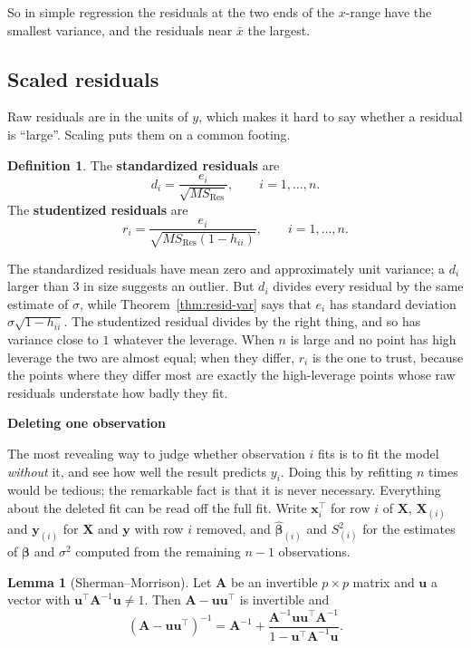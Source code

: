 \documentclass[11pt,a4paper]{article}
\numberwithin{equation}{section}
\theoremstyle{definition}
\newtheorem{defn}[thm]{Definition}
\newtheorem{lem}[thm]{Lemma}
\newcommand{\subhead}[1]{%
  \par\medskip\noindent\textbf{#1}\par\nobreak\smallskip}
\begin{document}
So in simple regression the residuals at the two ends of the $x$-range have the smallest
variance, and the residuals near $\bar x$ the largest.

\subsection{Scaled residuals}
Raw residuals are in the units of $y$, which makes it hard to say whether a residual is
``large''. Scaling puts them on a common footing.

\begin{defn}
The \textbf{standardized residuals} are
\[
d_i = \frac{e_i}{\sqrt{MS_{\mathrm{Res}}}} , \qquad i = 1, \dots, n .
\]
The \textbf{studentized residuals} are
\[
r_i = \frac{e_i}{\sqrt{MS_{\mathrm{Res}}(1 - h_{ii})}} , \qquad i = 1, \dots, n .
\]
\end{defn}

The standardized residuals have mean zero and approximately unit variance; a $d_i$ larger
than $3$ in size suggests an outlier. But $d_i$ divides every residual by the same estimate
of $\sigma$, while Theorem~\ref{thm:resid-var} says that $e_i$ has standard deviation
$\sigma\sqrt{1 - h_{ii}}$. The studentized residual divides by the right thing, and so has
variance close to $1$ whatever the leverage. When $n$ is large and no point has high
leverage the two are almost equal; when they differ, $r_i$ is the one to trust, because
the points where they differ most are exactly the high-leverage points whose raw residuals
understate how badly they fit.

\subhead{Deleting one observation}
The most revealing way to judge whether observation $i$ fits is to fit the model
\emph{without} it, and see how well the result predicts $y_i$. Doing this by refitting $n$
times would be tedious; the remarkable fact is that it is never necessary. Everything
about the deleted fit can be read off the full fit. Write $\mathbf{x}_i^\top$ for row $i$
of $\mathbf{X}$, $\mathbf{X}_{(i)}$ and $\mathbf{y}_{(i)}$ for $\mathbf{X}$ and $\mathbf{y}$
with row $i$ removed, and $\hat{\boldsymbol\beta}_{(i)}$ and $S^2_{(i)}$ for the estimates
of $\boldsymbol\beta$ and $\sigma^2$ computed from the remaining $n - 1$ observations.

\begin{lem}[Sherman--Morrison]\label{lem:sherman}
Let $\mathbf{A}$ be an invertible $p \times p$ matrix and $\mathbf{u}$ a vector with
$\mathbf{u}^\top\mathbf{A}^{-1}\mathbf{u} \neq 1$. Then $\mathbf{A} - \mathbf{u}\mathbf{u}^\top$ is
invertible and
\[
(\mathbf{A} - \mathbf{u}\mathbf{u}^\top)^{-1}
= \mathbf{A}^{-1} + \frac{\mathbf{A}^{-1}\mathbf{u}\mathbf{u}^\top\mathbf{A}^{-1}}{1 - \mathbf{u}^\top\mathbf{A}^{-1}\mathbf{u}} .
\]
\end{lem}
\end{document}
